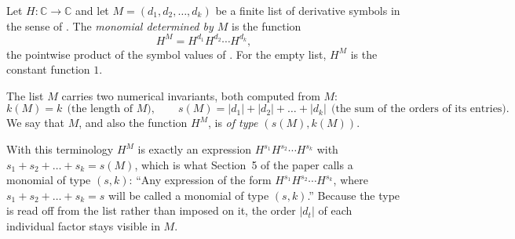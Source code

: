 \begin{definition}
Let $H\colon\mathbb{C}\to\mathbb{C}$ and let $M=(d_1,d_2,\dots,d_k)$ be a
finite list of derivative symbols in the sense of .  The
\emph{monomial determined by $M$} is the function
\[
  H^M=H^{d_1}H^{d_2}\cdots H^{d_k},
\]
the pointwise product of the symbol values of .  For the
empty list, $H^M$ is the constant function $1$.

The list $M$ carries two numerical invariants, both computed from $M$:
\[
  k(M)=k\ \ \text{(the length of $M$)},\qquad
  s(M)=|d_1|+|d_2|+\dots+|d_k|\ \ \text{(the sum of the orders of its entries)} .
\]
We say that $M$, and also the function $H^M$, is \emph{of type $(s(M),k(M))$}.

With this terminology $H^M$ is exactly an expression
$H^{s_1}H^{s_2}\cdots H^{s_k}$ with $s_1+s_2+\dots+s_k=s(M)$, which is what
Section~5 of the paper calls a monomial of type $(s,k)$: ``Any expression of
the form $H^{s_1}H^{s_2}\cdots H^{s_k}$, where $s_1+s_2+\dots+s_k=s$ will be
called a monomial of type $(s,k)$.''  Because the type is read off from the
list rather than imposed on it, the order $|d_t|$ of each individual factor
stays visible in $M$.
\end{definition}
